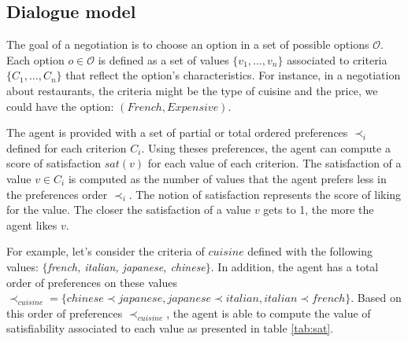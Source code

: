 \documentclass[conference, letterpaper]{IEEEtran}
\begin{document}
	
	
%	
%	
	
	\subsection{Dialogue model}
	
	\label{sec:dialogue-model}
	
	The goal of a negotiation is to choose an option in a set of possible options $\mathcal{O}$. Each option $o\in\mathcal{O}$ is defined as a set of values $\{v_1, ..., v_n\}$ associated to criteria $\{C_1, ..., C_n\}$ that reflect the option's characteristics.  
	For instance, in a negotiation about restaurants, the criteria might be the type of cuisine and the price, we could have the option: $(French,Expensive)$.
	
	The agent is provided with a set of partial or total ordered preferences $\prec_i$ defined for each criterion $C_i$. Using theses preferences, the agent can compute a score of satisfaction $sat(v)$ for each value of each criterion. The satisfaction of a value $v \in C_i$ is computed as the number of values that the agent prefers less in the preferences order $\prec_i$. The notion of satisfaction represents the score of liking for the value. The closer the satisfaction of a value $v$ gets to 1, the more the agent likes $v$.
	 
	 
	For example, let's consider the criteria of $cuisine$ defined with the following values: $\{$\emph{french, italian, japanese, chinese}$\}$. In addition, the agent has a total order of preferences on these values $ \prec_{cuisine}= \{chinese \prec japanese, japanese \prec italian, italian \prec french\}$. Based on this order of preferences $\prec_{cuisine}$, the agent is able to compute the value of satisfiability associated to each value as presented in table \ref{tab:sat}.
	
\end{document}
